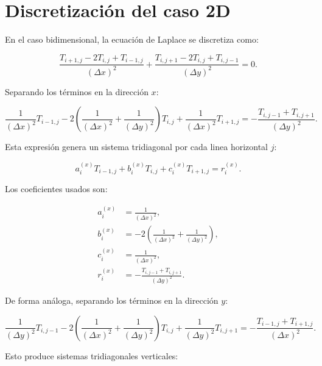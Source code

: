 \documentclass[11pt,a4paper]{article}
\begin{document}
\section{Discretizaci\'on del caso 2D}

En el caso bidimensional, la ecuaci\'on de Laplace se discretiza como:

\begin{equation}
\label{eq:laplace_2d}
\frac{T_{i+1,j}-2T_{i,j}+T_{i-1,j}}{(\Delta x)^2}
+
\frac{T_{i,j+1}-2T_{i,j}+T_{i,j-1}}{(\Delta y)^2}
=0.
\end{equation}

Separando los t\'erminos en la direcci\'on $x$:

\begin{equation}
\label{eq:laplace_2d_separated}
\frac{1}{(\Delta x)^2}T_{i-1,j}
-2\left(\frac{1}{(\Delta x)^2}+\frac{1}{(\Delta y)^2}\right)T_{i,j}
+\frac{1}{(\Delta x)^2}T_{i+1,j}
=-\frac{T_{i,j-1}+T_{i,j+1}}{(\Delta y)^2}.
\end{equation}

Esta expresi\'on genera un sistema tridiagonal por cada linea horizontal
$j$:

\begin{equation}
a_i^{(x)}T_{i-1,j}+b_i^{(x)}T_{i,j}+c_i^{(x)}T_{i+1,j}=r_i^{(x)}.
\end{equation}

Los coeficientes usados son:

\begin{align}
a_i^{(x)} &= \frac{1}{(\Delta x)^2}, \label{eq:coef_tridiagonal_x_2D_a} \\
b_i^{(x)} &= -2\left(\frac{1}{(\Delta x)^2}+\frac{1}{(\Delta y)^2}\right), \label{eq:coef_tridiagonal_x_2D_b} \\
c_i^{(x)} &= \frac{1}{(\Delta x)^2}, \label{eq:coef_tridiagonal_x_2D_c} \\
r_i^{(x)} &= -\frac{T_{i,j-1}+T_{i,j+1}}{(\Delta y)^2}.
\label{eq:coef_tridiagonal_x_2D_r}
\end{align}

De forma an\'aloga, separando los t\'erminos en la direcci\'on $y$:

\begin{equation}
\frac{1}{(\Delta y)^2}T_{i,j-1}
-2\left(\frac{1}{(\Delta x)^2}+\frac{1}{(\Delta y)^2}\right)T_{i,j}
+\frac{1}{(\Delta y)^2}T_{i,j+1}
=-\frac{T_{i-1,j}+T_{i+1,j}}{(\Delta x)^2}.
\end{equation}

Esto produce sistemas tridiagonales verticales:
\end{document}
